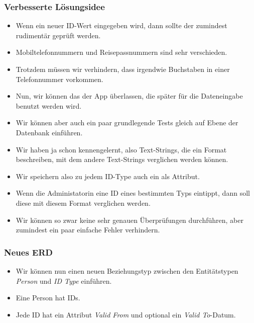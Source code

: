 \documentclass[aspectratio=169,mathserif,notheorems]{beamer}%
\begin{document}
\begin{frame}[t]%
\frametitle{Verbesserte Lösungsidee}%
\begin{itemize}%
%
%
\item<2-> Wenn ein neuer ID-Wert eingegeben wird, dann sollte der zumindest rudimentär geprüft werden.%
%
\item<3-> Mobiltelefonnummern und Reisepassnummern sind sehr verschieden.%
%
\item<4-> Trotzdem müssen wir verhindern, dass irgendwie Buchstaben in einer Telefonnummer vorkommen.%
%
\item<5-> Nun, wir können das der App überlassen, die später für die Dateneingabe benutzt werden wird.%
%
\item<6-> Wir können aber auch ein paar grundlegende Tests gleich auf Ebene der Datenbank einführen.%
%
\item<7-> Wir haben ja schon  kennengelernt, also Text-Strings, die ein Format beschreiben, mit dem andere Text-Strings verglichen werden können.%
%
\item<8-> Wir speichern also zu jedem ID-Type auch ein   als Attribut.%
%
\item<9-> Wenn die Administatorin eine ID eines bestimmten Typs eintippt, dann soll diese mit diesem Format verglichen werden.%
%
\item<10-> Wir können so zwar keine sehr genauen Überprüfungen durchführen, aber zumindest ein paar einfache Fehler verhindern.%
\end{itemize}%
\end{frame}%
%
\begin{frame}[t]%
\frametitle{Neues ERD}%
\begin{itemize}%
\item Wir können nun einen neuen Beziehungstyp zwischen den Entitätstypen \emph{Person} und \emph{ID Type} einführen.%
%
\item<2-> Eine Person hat IDs.%
%
\item<3-> Jede ID hat ein Attribut \emph{Valid From} und optional ein \emph{Valid To}-Datum.
\end{itemize}%
%
\end{frame}%
%
\end{document}
